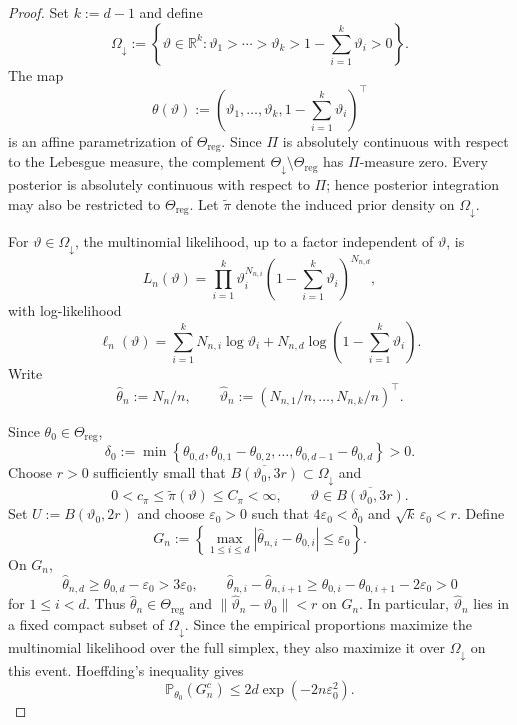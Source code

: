 \documentclass[10pt,a4paper]{amsart}
\theoremstyle{named}
\theoremstyle{named1}
\theoremstyle{plain}
\theoremstyle{remark}
\begin{document}
\begin{proof}
Set $k:=d-1$ and define
\[
    \Omega_{\downarrow}
    :=
    \left\{
        \vartheta\in\mathbb R^k:
        \vartheta_1>\cdots>\vartheta_k>
        1-\sum_{i=1}^k\vartheta_i>0
    \right\}.
\]
The map
\[
    \theta(\vartheta)
    :=
    \left(
        \vartheta_1,\ldots,\vartheta_k,
        1-\sum_{i=1}^k\vartheta_i
    \right)^\top
\]
is an affine parametrization of $\Theta_{\mathrm{reg}}$.
Since $\Pi$ is absolutely continuous with respect to the Lebesgue measure, the complement $\Theta_{\downarrow}\setminus\Theta_{\mathrm{reg}}$
has $\Pi$-measure zero. Every posterior is absolutely
continuous with respect to $\Pi$; hence posterior integration may also be
restricted to $\Theta_{\mathrm{reg}}$.
Let $\widetilde\pi$ denote the induced prior density on
$\Omega_{\downarrow}$.

For $\vartheta\in\Omega_{\downarrow}$, the multinomial likelihood, up to
a factor independent of $\vartheta$, is
\[
    L_n(\vartheta)
    =
    \prod_{i=1}^k\vartheta_i^{N_{n,i}}
    \left(1-\sum_{i=1}^k\vartheta_i\right)^{N_{n,d}},
\]
with log-likelihood
\[
    \ell_n(\vartheta)
    =
    \sum_{i=1}^kN_{n,i}\log\vartheta_i
    +N_{n,d}\log\left(1-\sum_{i=1}^k\vartheta_i\right).
\]
Write
\[
    \widehat\theta_n:=N_n/n,
    \qquad
    \widehat\vartheta_n
    :=(N_{n,1}/n,\ldots,N_{n,k}/n)^\top.
\]

Since $\theta_0\in\Theta_{\mathrm{reg}}$,
\[
    \delta_0
    :=
    \min\left\{
        \theta_{0,d},
        \theta_{0,1}-\theta_{0,2},\ldots,
        \theta_{0,d-1}-\theta_{0,d}
    \right\}>0.
\]
Choose $r>0$ sufficiently small that
$\overline{B(\vartheta_0,3r)}\subset\Omega_{\downarrow}$ and
\[
    0<c_\pi\leq\widetilde\pi(\vartheta)\leq C_\pi<\infty,
    \qquad
    \vartheta\in\overline{B(\vartheta_0,3r)}.
\]
Set $U:=B(\vartheta_0,2r)$ and choose $\varepsilon_0>0$ such that
$4\varepsilon_0<\delta_0$ and $\sqrt{k}\,\varepsilon_0<r$.
Define
\[
    G_n
    :=
    \left\{
        \max_{1\leq i\leq d}
        |\widehat\theta_{n,i}-\theta_{0,i}|
        \leq\varepsilon_0
    \right\}.
\]
On $G_n$,
\[
    \widehat\theta_{n,d}
    \geq\theta_{0,d}-\varepsilon_0>3\varepsilon_0,
    \qquad
    \widehat\theta_{n,i}-\widehat\theta_{n,i+1}
    \geq\theta_{0,i}-\theta_{0,i+1}-2\varepsilon_0>0
\]
for $1\leq i<d$. Thus $\widehat\theta_n\in\Theta_{\mathrm{reg}}$ and
$\|\widehat\vartheta_n-\vartheta_0\|<r$ on $G_n$. In particular,
$\widehat\vartheta_n$ lies in a fixed compact subset of
$\Omega_{\downarrow}$. Since the empirical proportions maximize the
multinomial likelihood over the full simplex, they also maximize it over
$\Omega_{\downarrow}$ on this event. Hoeffding's inequality gives
\begin{equation}
    \mathbb P_{\theta_0}(G_n^c)
    \leq2d\exp(-2n\varepsilon_0^2).
    \label{eq:good-event-probability}
\end{equation}


\end{proof}
\end{document}
